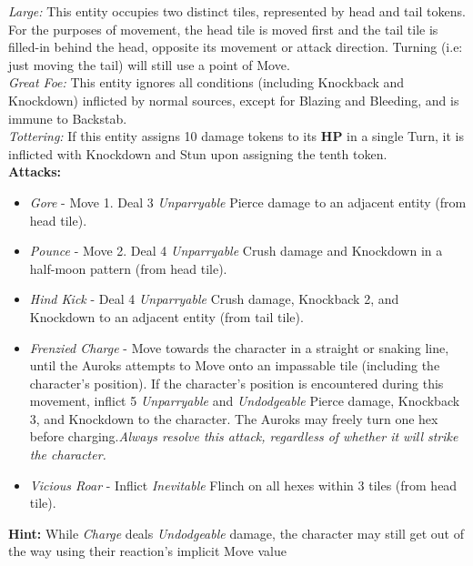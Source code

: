 \emph{Large:} This entity occupies two distinct tiles, represented by head and tail tokens. For the purposes of movement, the head tile is moved first and the tail tile is filled-in behind the head, opposite its movement or attack direction. Turning (i.e: just moving the tail) will still use a point of Move.\\

\emph{Great Foe:} This entity ignores all conditions (including Knockback and Knockdown) inflicted by normal sources, except for Blazing and Bleeding, and is immune to Backstab.\\

\emph{Tottering:} If this entity assigns 10 damage tokens to its \textbf{HP} in a single Turn, it is inflicted with Knockdown and Stun upon assigning the tenth token.\\

\textbf{Attacks:}
\begin{itemize}
\item \emph{Gore} -  Move 1. Deal 3 \emph{Unparryable} Pierce damage to an adjacent entity (from head tile).
\item \emph{Pounce} - Move 2. Deal 4 \emph{Unparryable} Crush damage and Knockdown in a half-moon pattern (from head tile).
\item \emph{Hind Kick} - Deal 4 \emph{Unparryable} Crush damage, Knockback 2, and Knockdown to an adjacent entity (from tail tile).
\item \emph{Frenzied Charge} - Move towards the character in a straight or snaking line, until the Auroks attempts to Move onto an impassable tile (including the character’s position). If the character’s position is encountered during this movement, inflict 5 \emph{Unparryable} and \emph{Undodgeable} Pierce damage, Knockback 3, and Knockdown to the character. The Auroks may freely turn one hex before charging.\newline \emph{Always resolve this attack, regardless of whether it will strike the character.}
\item \emph{Vicious Roar} - Inflict \emph{Inevitable} Flinch on all hexes within 3 tiles (from head tile).
\end{itemize}

\begin{tcolorbox}
\textbf{Hint:} While \emph{Charge} deals \emph{Undodgeable} damage, the character may still get out of the way using their reaction’s implicit Move value
\end{tcolorbox}

